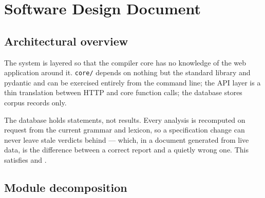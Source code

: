 \section{Software Design Document}\label{part:sdd}

\subsection{Architectural overview}

The system is layered so that the compiler core has no knowledge of the web application
around it. \texttt{core/} depends on nothing but the standard library and pydantic and can
be exercised entirely from the command line; the API layer is a thin translation between
HTTP and core function calls; the database stores corpus records only.


\begin{keypoint}
The database holds statements, not results. Every analysis is recomputed on request from
the current grammar and lexicon, so a specification change can never leave stale verdicts
behind --- which, in a document generated from live data, is the difference between a
correct report and a quietly wrong one. This satisfies  and .
\end{keypoint}

\subsection{Module decomposition}

